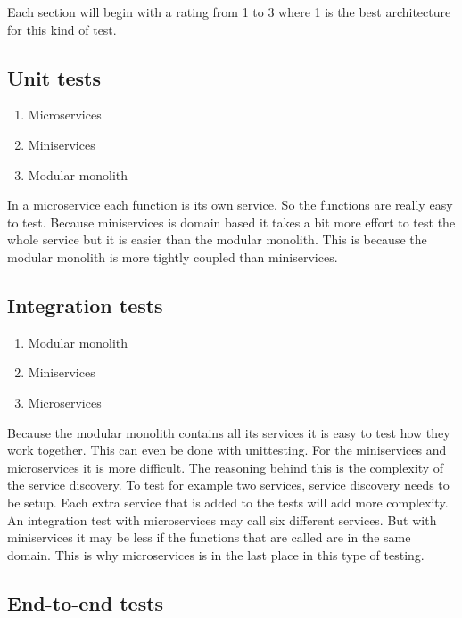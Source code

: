 Each section will begin with a rating from 1 to 3 where 1 is the best architecture for this kind of test.

\subsection{Unit tests}
\label{sec:UnitTests}

\begin{enumerate}
        \item Microservices
        \item Miniservices
        \item Modular monolith
\end{enumerate}

In a microservice each function is its own service. So the functions are really easy to test. Because miniservices is domain based it takes a bit more effort to test the whole service but it is easier than the modular monolith. This is because the modular monolith is more tightly coupled than miniservices.

\subsection{Integration tests}
\label{sec:IntegrationTests}

\begin{enumerate}
        \item Modular monolith
        \item Miniservices
        \item Microservices
\end{enumerate}

Because the modular monolith contains all its services it is easy to test how they work together. This can even be done with unittesting. For the miniservices and microservices it is more difficult. The reasoning behind this is the complexity of the service discovery. To test for example two services, service discovery needs to be setup. Each extra service that is added to the tests will add more complexity. An integration test with microservices may call six different services. But with miniservices it may be less if the functions that are called are in the same domain. This is why microservices is in the last place in this type of testing.

\subsection{End-to-end tests}

